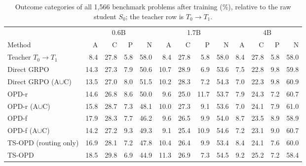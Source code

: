 \begin{table}[h]
\centering
\scriptsize
\setlength{\tabcolsep}{3pt}
\caption{Outcome categories of all 1{,}566 benchmark problems after training (\%), relative to the raw student $S_0$; the teacher row is $T_0\to T_1$.}
\label{tab:app-acpn}
\begin{tabular}{lrrrrrrrrrrrr}
\toprule
 & \multicolumn{4}{c}{0.6B} & \multicolumn{4}{c}{1.7B} & \multicolumn{4}{c}{4B} \\
\cmidrule(lr){2-5}\cmidrule(lr){6-9}\cmidrule(lr){10-13}
Method & A & C & P & N & A & C & P & N & A & C & P & N \\
\midrule
Teacher $T_0\!\to\!T_1$ & 8.4 & 27.8 & 5.8 & 58.0 & 8.4 & 27.8 & 5.8 & 58.0 & 8.4 & 27.8 & 5.8 & 58.0 \\
Direct GRPO & 14.3 & 27.3 & 7.9 & 50.6 & 10.7 & 28.9 & 6.9 & 53.6 & 7.5 & 22.8 & 9.8 & 59.8 \\
Direct GRPO (A$\cup$C) & 13.5 & 27.0 & 8.0 & 51.5 & 10.2 & 28.3 & 7.2 & 54.3 & 7.0 & 22.3 & 9.8 & 60.9 \\
OPD-r & 14.6 & 26.8 & 8.6 & 50.0 & 9.6 & 25.0 & 11.7 & 53.7 & 7.9 & 24.3 & 7.2 & 60.7 \\
OPD-r (A$\cup$C) & 15.8 & 28.7 & 7.3 & 48.1 & 10.0 & 27.3 & 9.1 & 53.6 & 7.0 & 24.1 & 7.9 & 61.0 \\
OPD-f & 17.9 & 28.3 & 7.7 & 46.2 & 9.6 & 26.5 & 9.9 & 54.0 & 8.7 & 23.5 & 8.9 & 58.9 \\
OPD-f (A$\cup$C) & 14.2 & 27.2 & 9.3 & 49.3 & 9.1 & 25.4 & 10.9 & 54.6 & 7.2 & 23.1 & 9.0 & 60.7 \\
TS-OPD (routing only) & 16.9 & 28.1 & 7.2 & 47.8 & 10.4 & 26.4 & 9.9 & 53.4 & 8.4 & 24.1 & 7.6 & 60.0 \\
TS-OPD & 18.5 & 29.8 & 6.9 & 44.9 & 11.3 & 26.9 & 7.3 & 54.5 & 9.2 & 25.2 & 7.2 & 58.4 \\
\bottomrule
\end{tabular}
\end{table}

